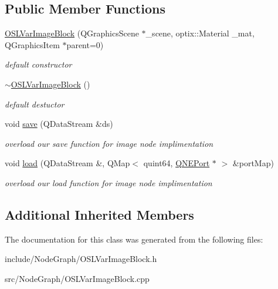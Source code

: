\subsection*{Public Member Functions}
\begin{DoxyCompactItemize}
\item 
\hypertarget{class_o_s_l_var_image_block_a371aa661555240e202283bdb2868d823}{\hyperlink{class_o_s_l_var_image_block_a371aa661555240e202283bdb2868d823}{O\-S\-L\-Var\-Image\-Block} (Q\-Graphics\-Scene $\ast$\-\_\-scene, optix\-::\-Material \-\_\-mat, Q\-Graphics\-Item $\ast$parent=0)}\label{class_o_s_l_var_image_block_a371aa661555240e202283bdb2868d823}

\begin{DoxyCompactList}\small\item\em default constructor \end{DoxyCompactList}\item 
\hypertarget{class_o_s_l_var_image_block_af15cb8dce158fd24aa1695d3e1878e04}{\hyperlink{class_o_s_l_var_image_block_af15cb8dce158fd24aa1695d3e1878e04}{$\sim$\-O\-S\-L\-Var\-Image\-Block} ()}\label{class_o_s_l_var_image_block_af15cb8dce158fd24aa1695d3e1878e04}

\begin{DoxyCompactList}\small\item\em default destuctor \end{DoxyCompactList}\item 
\hypertarget{class_o_s_l_var_image_block_a3f7d621c8dcba490c4fa5a15c5be6ed8}{void \hyperlink{class_o_s_l_var_image_block_a3f7d621c8dcba490c4fa5a15c5be6ed8}{save} (Q\-Data\-Stream \&ds)}\label{class_o_s_l_var_image_block_a3f7d621c8dcba490c4fa5a15c5be6ed8}

\begin{DoxyCompactList}\small\item\em overload our save function for image node implimentation \end{DoxyCompactList}\item 
\hypertarget{class_o_s_l_var_image_block_a155e7a032f9df5e3c49edff6216a7348}{void \hyperlink{class_o_s_l_var_image_block_a155e7a032f9df5e3c49edff6216a7348}{load} (Q\-Data\-Stream \&, Q\-Map$<$ quint64, \hyperlink{class_q_n_e_port}{Q\-N\-E\-Port} $\ast$ $>$ \&port\-Map)}\label{class_o_s_l_var_image_block_a155e7a032f9df5e3c49edff6216a7348}

\begin{DoxyCompactList}\small\item\em overload our load function for image node implimentation \end{DoxyCompactList}\end{DoxyCompactItemize}
\subsection*{Additional Inherited Members}


The documentation for this class was generated from the following files\-:\begin{DoxyCompactItemize}
\item 
include/\-Node\-Graph/O\-S\-L\-Var\-Image\-Block.\-h\item 
src/\-Node\-Graph/O\-S\-L\-Var\-Image\-Block.\-cpp\end{DoxyCompactItemize}
